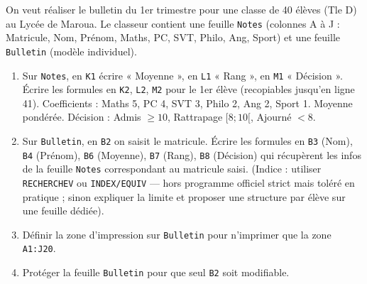 \documentclass[11pt]{article}
\begin{document}
\begin{exercice}
On veut réaliser le bulletin du 1er trimestre pour une classe de 40 élèves (Tle D) au Lycée de Maroua.
Le classeur contient une feuille \texttt{Notes} (colonnes A à J : Matricule, Nom, Prénom, Maths, PC, SVT, Philo, Ang, Sport) et une feuille \texttt{Bulletin} (modèle individuel).
\begin{enumerate}
\item Sur \texttt{Notes}, en \texttt{K1} écrire « Moyenne », en \texttt{L1} « Rang », en \texttt{M1} « Décision ». Écrire les formules en \texttt{K2}, \texttt{L2}, \texttt{M2} pour le 1er élève (recopiables jusqu'en ligne 41). Coefficients : Maths 5, PC 4, SVT 3, Philo 2, Ang 2, Sport 1. Moyenne pondérée. Décision : Admis $\geq 10$, Rattrapage $[8;10[$, Ajourné $<8$.
\item Sur \texttt{Bulletin}, en \texttt{B2} on saisit le matricule. Écrire les formules en \texttt{B3} (Nom), \texttt{B4} (Prénom), \texttt{B6} (Moyenne), \texttt{B7} (Rang), \texttt{B8} (Décision) qui récupèrent les infos de la feuille \texttt{Notes} correspondant au matricule saisi. (Indice : utiliser \texttt{RECHERCHEV} ou \texttt{INDEX/EQUIV} — hors programme officiel strict mais toléré en pratique ; sinon expliquer la limite et proposer une structure par élève sur une feuille dédiée).
\item Définir la zone d'impression sur \texttt{Bulletin} pour n'imprimer que la zone \texttt{A1:J20}.
\item Protéger la feuille \texttt{Bulletin} pour que seul \texttt{B2} soit modifiable.
\end{enumerate}
\end{exercice}
\end{document}

